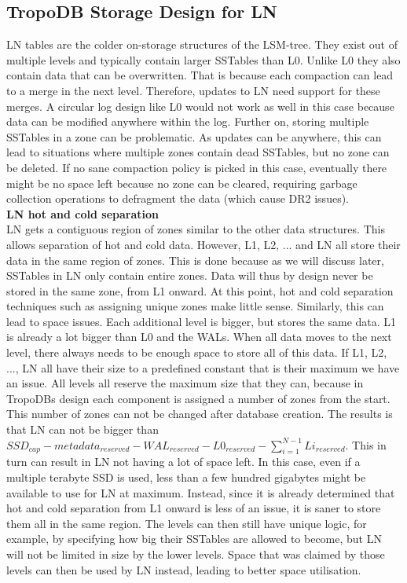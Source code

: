 \subsection{TropoDB Storage Design for LN}
\label{sec:ln}
LN tables are the colder on-storage structures of the LSM-tree. They exist out of multiple levels and typically contain larger SSTables than L0. Unlike L0 they also contain data that can be overwritten. That is because each compaction can lead to a merge in the next level. Therefore, updates to LN need support for these merges. A circular log design like L0 would not work as well in this case because data can be modified anywhere within the log. Further on, storing multiple SSTables in a zone can be problematic. As updates can be anywhere, this can lead to situations where multiple zones contain dead SSTables, but no zone can be deleted. If no sane compaction policy is picked in this case, eventually there might be no space left because no zone can be cleared, requiring garbage collection operations to defragment the data (which cause DR2 issues).\\
\textbf{LN hot and cold separation}\\
LN gets a contiguous region of zones similar to the other data structures. This allows separation of hot and cold data. However, L1, L2, ... and LN all store their data in the same region of zones. This is done because as we will discuss later, SSTables in LN only contain entire zones. Data will thus by design never be stored in the same zone, from L1 onward. At this point, hot and cold separation techniques such as assigning unique zones make little sense. Similarly, this can lead to space issues. Each additional level is bigger, but stores the same data. L1 is already a lot bigger than L0 and the WALs. When all data moves to the next level, there always needs to be enough space to store all of this data. If L1, L2, ..., LN all have their size to a predefined constant that is their maximum we have an issue. All levels all reserve the maximum size that they can, because in TropoDBs design each component is assigned a number of zones from the start. This number of zones can not be changed after database creation. The results is that LN can not be bigger than $SSD_{cap} - metadata_{reserved} - WAL_{reserved} - L0_{reserved} - \sum_{i=1}^{N-1}{Li_{reserved}}$.  This in turn can result in LN not having a lot of space left. In this case, even if a multiple terabyte SSD is used, less than a few hundred gigabytes might be available to use for LN at maximum. Instead, since it is already determined that hot and cold separation from L1 onward is less of an issue, it is saner to store them all in the same region. The levels can then still have unique logic, for example, by specifying how big their SSTables are allowed to become, but LN will not be limited in size by the lower levels. Space that was claimed by those levels can then be used by LN instead, leading to better space utilisation.\\
